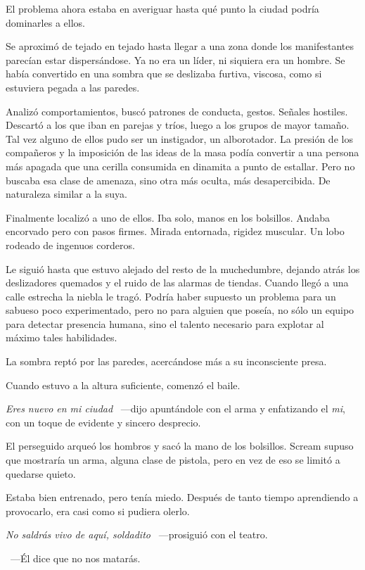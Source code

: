 El problema ahora estaba en averiguar hasta qué punto la ciudad podría dominarles a ellos.

Se aproximó de tejado en tejado hasta llegar a una zona donde los manifestantes parecían estar dispersándose. Ya no era un líder, ni siquiera era un hombre. Se había convertido en una sombra que se deslizaba furtiva, viscosa, como si estuviera pegada a las paredes.

Analizó comportamientos, buscó patrones de conducta, gestos. Señales hostiles. Descartó a los que iban en parejas y tríos, luego a los grupos de mayor tamaño. Tal vez alguno de ellos pudo ser un instigador, un alborotador. La presión de los compañeros y la imposición de las ideas de la masa podía convertir a una persona más apagada que una cerilla consumida en dinamita a punto de estallar. Pero no buscaba esa clase de amenaza, sino otra más oculta, más desapercibida. De naturaleza similar a la suya.

Finalmente localizó a uno de ellos. Iba solo, manos en los bolsillos. Andaba encorvado pero con pasos firmes. Mirada entornada, rigidez muscular. Un lobo rodeado de ingenuos corderos.

Le siguió hasta que estuvo alejado del resto de la muchedumbre, dejando atrás los deslizadores quemados y el ruido de las alarmas de tiendas. Cuando llegó a una calle estrecha la niebla le tragó. Podría haber supuesto un problema para un sabueso poco experimentado, pero no para alguien que poseía, no sólo un equipo para detectar presencia humana, sino el talento necesario para explotar al máximo tales habilidades.

La sombra reptó por las paredes, acercándose más a su inconsciente presa.

Cuando estuvo a la altura suficiente, comenzó el baile.

\emph{Eres nuevo en mi ciudad} ~---dijo apuntándole con el arma y enfatizando el \emph{mi}, con un toque de evidente y sincero desprecio.

El perseguido arqueó los hombros y sacó la mano de los bolsillos. Scream supuso que mostraría un arma, alguna clase de pistola, pero en vez de eso se limitó a quedarse quieto.

Estaba bien entrenado, pero tenía miedo. Después de tanto tiempo aprendiendo a provocarlo, era casi como si pudiera olerlo.

\emph{No saldrás vivo de aquí, soldadito} ~---prosiguió con el teatro.

~---Él dice que no nos matarás.


